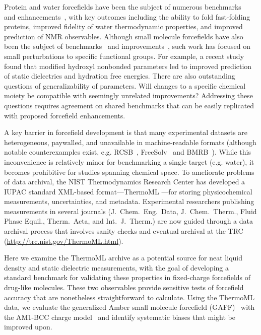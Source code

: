 \documentclass[aps,pre,twocolumn,nofootinbib,superscriptaddress,linenumbers]{revtex4-1}
\begin{document}
Protein and water forcefields have been the subject of numerous benchmarks~\cite{} and enhancements~\cite{}, with key outcomes including the ability to fold fast-folding proteins, improved fidelity of water thermodynamic properties, and improved prediction of NMR observables.  
Although small molecule forcefields have also been the subject of benchmarks~\cite{} and improvements~\cite{}, such work has focused on small perturbations to specific functional groups.  
For example, a recent study found that modified hydroxyl nonbonded parameters led to improved prediction of static dielectrics and hydration free energies.  
There are also outstanding questions of generalizability of parameters.  
Will changes to a specific chemical moiety be compatible with seemingly unrelated improvements?  
Addressing these questions requires agreement on shared benchmarks that can be easily replicated with proposed forcefield enhancements.

A key barrier in forcefield development is that many experimental datasets are heterogeneous, paywalled, and unavailable in machine-readable formats (although notable counterexamples exist, e.g. RCSB~\cite{Berman2000}, FreeSolv~\cite{freesolv} and BMRB~\cite{Ulrich2008}).  
While this inconvenience is relatively minor for benchmarking a single target (e.g. water), it becomes prohibitive for studies spanning chemical space.  
To ameliorate problems of data archival, the NIST Thermodynamics Research Center has developed a IUPAC standard XML-based format---ThermoML \cite{frenkel2006xml}---for storing physicochemical measurements, uncertainties, and metadata.
 Experimental researchers publishing measurements in several journals (J.~Chem.~Eng.~Data, J.~Chem.~Therm., Fluid Phase Equil., Therm.~Acta, and Int.~J.~Therm.) are now guided through a data archival process that involves sanity checks and eventual archival at the TRC (\url{http://trc.nist.gov/ThermoML.html}).  

Here we examine the ThermoML archive as a potential source for neat liquid density and static dielectric measurements, with the goal of developing a standard benchmark for validating these properties in fixed-charge forcefields of drug-like molecules.  
These two observables provide sensitive tests of forcefield accuracy that are nonetheless straightforward to calculate.  
Using the ThermoML data, we evaluate the generalized Amber small molecule forcefield (GAFF)~\cite{gaff} with the AM1-BCC charge model~\cite{am1bcc1,am1bcc2} and identify systematic biases that might be improved upon.
\end{document}
